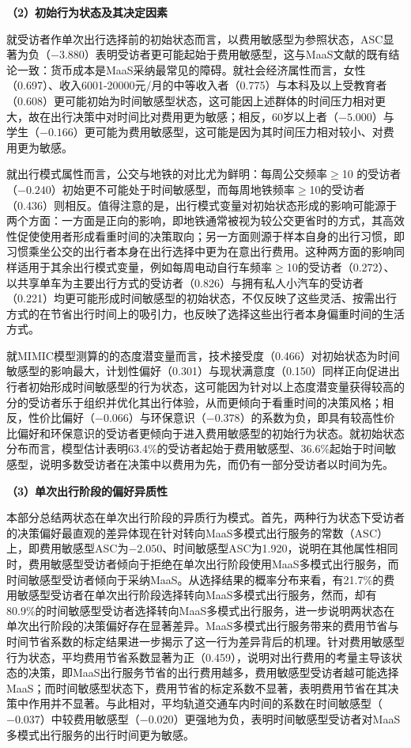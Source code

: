 \textbf{（2）初始行为状态及其决定因素}

就受访者作单次出行选择前的初始状态而言，以费用敏感型为参照状态，ASC显著为负（$-3.880$）表明受访者更可能起始于费用敏感型，这与MaaS文献的既有结论一致：货币成本是MaaS采纳最常见的障碍\citep{kimComparativeAnalysisUsers2021,kriswardhanaGenerationalDifferencesPreferences2025}。就社会经济属性而言，女性（0.697）、收入6001-20000元/月的中等收入者（0.775）与本科及以上受教育者（0.608）更可能初始为时间敏感型状态，这可能因上述群体的时间压力相对更大，故在出行决策中对时间比对费用更为敏感；相反，60岁以上者（$-5.000$）与学生（$-0.166$）更可能为费用敏感型，这可能是因为其时间压力相对较小、对费用更为敏感。

就出行模式属性而言，公交与地铁的对比尤为鲜明：每周公交频率$\geq$10 的受访者（$-0.240$）初始更不可能处于时间敏感型，而每周地铁频率$\geq$10的受访者（0.436）则相反。值得注意的是，出行模式变量对初始状态形成的影响可能源于两个方面：一方面是正向的影响，即地铁通常被视为较公交更省时的方式，其高效性促使使用者形成看重时间的决策取向；另一方面则源于样本自身的出行习惯，即习惯乘坐公交的出行者本身在出行选择中更为在意出行费用。这种两方面的影响同样适用于其余出行模式变量，例如每周电动自行车频率$\geq$10的受访者（0.272）、以共享单车为主要出行方式的受访者（0.826）与拥有私人小汽车的受访者（0.221）均更可能形成时间敏感型的初始状态，不仅反映了这些灵活、按需出行方式的在节省出行时间上的吸引力，也反映了选择这些出行者本身偏重时间的生活方式。

就MIMIC模型测算的的态度潜变量而言，技术接受度（0.466）对初始状态为时间敏感型的影响最大，计划性偏好（0.301）与现状满意度（0.150）同样正向促进出行者初始形成时间敏感型的行为状态，这可能因为针对以上态度潜变量获得较高的分的受访者乐于组织并优化其出行体验，从而更倾向于看重时间的决策风格；相反，性价比偏好（$-0.066$）与环保意识（$-0.378$）的系数为负，即具有较高性价比偏好和环保意识的受访者更倾向于进入费用敏感型的初始行为状态。就初始状态分布而言，模型估计表明63.4\%的受访者起始于费用敏感型、36.6\%起始于时间敏感型，说明多数受访者在决策中以费用为先，而仍有一部分受访者以时间为先。

\textbf{（3）单次出行阶段的偏好异质性}

本部分总结两状态在单次出行阶段的异质行为模式。首先，两种行为状态下受访者的决策偏好最直观的差异体现在针对转向MaaS多模式出行服务的常数（ASC）上，即费用敏感型ASC为$-2.050$、时间敏感型ASC为1.920，说明在其他属性相同时，费用敏感型受访者倾向于拒绝在单次出行阶段使用MaaS多模式出行服务，而时间敏感型受访者倾向于采纳MaaS。从选择结果的概率分布来看，有21.7\%的费用敏感型受访者在单次出行阶段选择转向MaaS多模式出行服务，然而，却有80.9\%的时间敏感型受访者选择转向MaaS多模式出行服务，进一步说明两状态在单次出行阶段的决策偏好存在显著差异。MaaS多模式出行服务带来的费用节省与时间节省系数的标定结果进一步揭示了这一行为差异背后的机理。针对费用敏感型行为状态，平均费用节省系数显著为正（0.459），说明对出行费用的考量主导该状态的决策，即MaaS出行服务节省的出行费用越多，费用敏感型受访者越可能选择MaaS；而时间敏感型状态下，费用节省的标定系数不显著，表明费用节省在其决策中作用并不显著。与此相对，平均轨道交通车内时间的系数在时间敏感型（$-0.037$）中较费用敏感型（$-0.020$）更强地为负，表明时间敏感型受访者对MaaS多模式出行服务的出行时间更为敏感。

